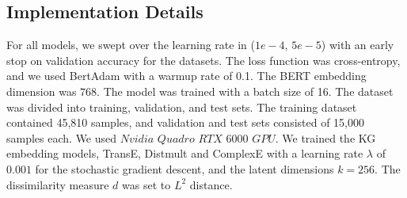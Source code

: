 {\vspace{-1em}
\subsection{Implementation Details}
\label{implementation-details}
\vspace{-1mm}
For all models, we swept over the learning rate in ($1e-4$, $5e-5$) with an early stop on validation accuracy for the datasets. The loss function was cross-entropy, and
we used BertAdam \cite{devlin2019google} with a warmup rate of 0.1. The BERT embedding dimension was $768$. The model was trained with a batch size of 16. The dataset was divided into training, validation, and test sets. The training dataset contained 45,810 samples, and validation and test sets consisted of 15,000 samples each.
We used $Nvidia$ $Quadro$ $RTX$ $6000$ $GPU$.
We trained the KG embedding models, TransE, Distmult and ComplexE with a learning rate $\lambda$ of  $0.001$ for the stochastic gradient descent, and the latent dimensions $k = 256$. The dissimilarity measure $d$ was set to $L^2$ distance. 

}
